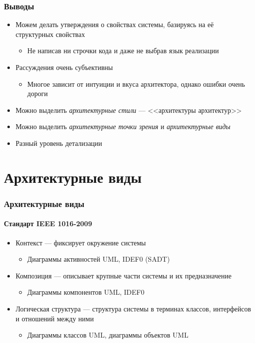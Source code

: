 \documentclass[xetex,mathserif,serif]{beamer}
\begin{document}
    \begin{frame}
        \frametitle{Выводы}
        \begin{itemize}
            \item Можем делать утверждения о свойствах системы, базируясь на её структурных свойствах
            \begin{itemize}
                \item Не написав ни строчки кода и даже не выбрав язык реализации
            \end{itemize}
            \item Рассуждения очень субъективны
            \begin{itemize}
                \item Многое зависит от интуиции и вкуса архитектора, однако ошибки очень дороги
            \end{itemize}
            \item Можно выделить \emph{архитектурные стили} --- <<архитектуры архитектур>>
            \item Можно выделить \emph{архитектурные точки зрения} и \emph{архитектурные виды}
            \item Разный уровень детализации
        \end{itemize}
    \end{frame}

    \section{Архитектурные виды}

    \begin{frame}
        \frametitle{Архитектурные виды}
        \framesubtitle{Стандарт IEEE 1016-2009}
        \begin{itemize}
            \item Контекст --- фиксирует окружение системы
            \begin{itemize}
                \item Диаграммы активностей UML, IDEF0 (SADT)
            \end{itemize}
            \item Композиция --- описывает крупные части системы и их предназначение
            \begin{itemize}
                \item Диаграммы компонентов UML, IDEF0
            \end{itemize}
            \item Логическая структура --- структура системы в терминах классов, интерфейсов и отношений между ними
            \begin{itemize}
                \item Диаграммы классов UML, диаграммы объектов UML
            \end{itemize}
        \end{itemize}
    \end{frame}
\end{document}
